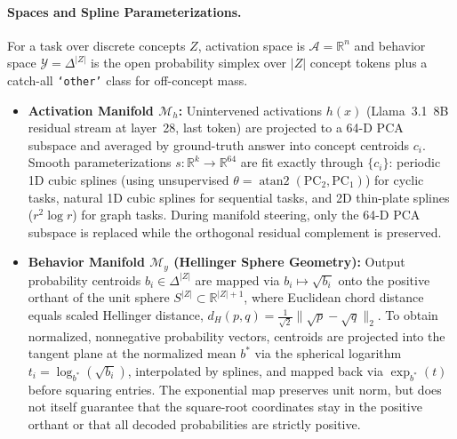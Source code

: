 \documentclass[10pt,a4paper]{article}
\newcommand{\R}{\mathbb{R}}
\newcommand{\Mh}{\mathcal{M}_h}
\newcommand{\My}{\mathcal{M}_y}
\begin{document}
\paragraph{Spaces and Spline Parameterizations.}
For a task over discrete concepts $Z$, activation space is $\mathcal{A} = \R^n$ and behavior space $\mathcal{Y} = \Delta^{|Z|}$ is the open probability simplex over $|Z|$ concept tokens plus a catch-all \texttt{`other'} class for off-concept mass.
\begin{itemize}[leftmargin=*,nosep]
    \item \textbf{Activation Manifold $\Mh$:} Unintervened activations $h(x)$ (Llama~3.1~8B residual stream at layer~28, last token) are projected to a 64-D PCA subspace and averaged by ground-truth answer into concept centroids $c_i$. Smooth parameterizations $s : \R^k \to \R^{64}$ are fit exactly through $\{c_i\}$: periodic 1D cubic splines (using unsupervised $\theta = \operatorname{atan2}(\mathrm{PC}_2, \mathrm{PC}_1)$) for cyclic tasks, natural 1D cubic splines for sequential tasks, and 2D thin-plate splines ($r^2 \log r$) for graph tasks. During manifold steering, only the 64-D PCA subspace is replaced while the orthogonal residual complement is preserved.
    \item \textbf{Behavior Manifold $\My$ (Hellinger Sphere Geometry):} Output probability centroids $b_i \in \Delta^{|Z|}$ are mapped via $b_i \mapsto \sqrt{b_i}$ onto the positive orthant of the unit sphere $S^{|Z|} \subset \R^{|Z|+1}$, where Euclidean chord distance equals scaled Hellinger distance, $d_H(p,q) = \frac{1}{\sqrt{2}}\|\sqrt{p} - \sqrt{q}\|_2$. To obtain normalized, nonnegative probability vectors, centroids are projected into the tangent plane at the normalized mean $b^*$ via the spherical logarithm $t_i = \log_{b^*}(\sqrt{b_i})$, interpolated by splines, and mapped back via $\exp_{b^*}(t)$ before squaring entries. The exponential map preserves unit norm, but does not itself guarantee that the square-root coordinates stay in the positive orthant or that all decoded probabilities are strictly positive.
\end{itemize}
\end{document}
